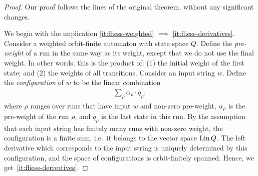\begin{proof} Our proof follows the lines of the original theorem, without any significant changes.

    We begin with the implication \ref{it:fliess-weighted} $\implies$ \ref{it:fliess-derivatives}. Consider a weighted orbit-finite automaton with state space $Q$. 
    Define the \emph{pre-weight} of a run in the same way as its weight, except that we do not use the final weight. In other words, this is the product of: (1) the initial weight of the first state; and (2) the weights of all transitions. Consider an input string $w$. Define the \emph{configuration} of $w$ to be the linear combination
    \begin{align}
        \label{eq:configuration-wa}
        \sum_\rho \alpha_\rho \cdot q_\rho,
    \end{align}
    where $\rho$ ranges over runs that have input $w$ and non-zero pre-weight, $\alpha_\rho$ is the pre-weight of the run $\rho$, and $q_\rho$ is the last state in this run. By the assumption that each input string has finitely many runs with non-zero weight, the configuration is a finite sum, i.e.~it belongs to the vector space $\operatorname{Lin} Q$. The left derivative which corresponds to the input string is uniquely determined by this configuration, and the space of configurations is orbit-finitely spanned. Hence, we get~\ref{it:fliess-derivatives}.


\end{proof}
